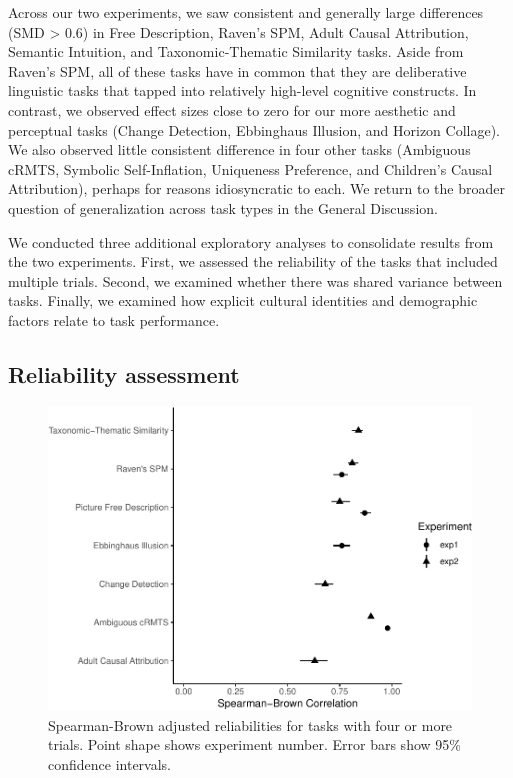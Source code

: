 \documentclass[
  man,floatsintext]{apa6}
\begin{document}
Across our two experiments, we saw consistent and generally large differences (SMD \textgreater{} 0.6) in Free Description, Raven's SPM, Adult Causal Attribution, Semantic Intuition, and Taxonomic-Thematic Similarity tasks. Aside from Raven's SPM, all of these tasks have in common that they are deliberative linguistic tasks that tapped into relatively high-level cognitive constructs. In contrast, we observed effect sizes close to zero for our more aesthetic and perceptual tasks (Change Detection, Ebbinghaus Illusion, and Horizon Collage). We also observed little consistent difference in four other tasks (Ambiguous cRMTS, Symbolic Self-Inflation, Uniqueness Preference, and Children's Causal Attribution), perhaps for reasons idiosyncratic to each. We return to the broader question of generalization across task types in the General Discussion.

We conducted three additional exploratory analyses to consolidate results from the two experiments. First, we assessed the reliability of the tasks that included multiple trials. Second, we examined whether there was shared variance between tasks. Finally, we examined how explicit cultural identities and demographic factors relate to task performance.

\hypertarget{reliability-assessment}{%
\subsection{Reliability assessment}\label{reliability-assessment}}

\begin{figure}
\centering
\includegraphics{CCRR_manuscript_files/figure-latex/reliability-1.pdf}
\caption{\label{fig:reliability}Spearman-Brown adjusted reliabilities for tasks with four or more trials. Point shape shows experiment number. Error bars show 95\% confidence intervals.}
\end{figure}
\end{document}

